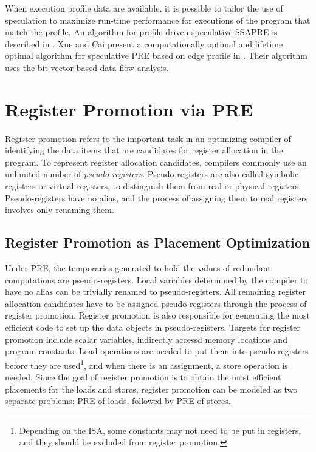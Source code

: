 When execution profile data are available, it is possible to tailor the use
of speculation to maximize run-time performance for executions of the program
that match the profile.  An algorithm for profile-driven speculative SSAPRE
is described in \cite{Lo98}.  Xue and Cai present a computationally optimal
and lifetime optimal algorithm
for speculative PRE based on edge profile in \cite{Xue06}.  Their algorithm
uses the bit-vector-based data flow analysis.

\section{Register Promotion via PRE}

Register promotion refers to the important task in an optimizing compiler
of identifying the data items that are candidates for register allocation 
in the program.  To represent register allocation candidates, compilers
commonly use an unlimited number of \emph{pseudo-registers}.  Pseudo-registers
are also called symbolic registers or virtual registers, to distinguish them
from real or physical registers.  Pseudo-registers have no alias, and the
process of assigning them to real registers involves only renaming them.

\subsection{Register Promotion as Placement Optimization}

Under PRE, the temporaries generated to hold the values of redundant 
computations are pseudo-registers.  Local variables determined by the compiler
to have no alias can be trivially renamed to pseudo-registers.   All remaining
register allocation candidates have to be assigned pseudo-registers through 
the process of register promotion.  Register promotion is also responsible
for generating the most efficient code to set up the data objects in
pseudo-registers.  Targets for register promotion include scalar variables,
indirectly accessd memory locations and program constants.  
Load operations are needed to put them into pseudo-registers before
they are used\footnote{Depending on the ISA, some constants may not need to be
put in registers, and they should be excluded from register promotion.}, and
when there is an assignment, a store operation is needed.  Since the goal of
register promotion is to obtain the most efficient placements for the loads and
stores, register promotion can be modeled as two separate problems: PRE of 
loads, followed by PRE of stores.

